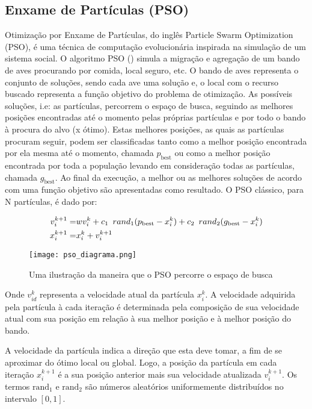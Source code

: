 \documentclass{article}
\begin{document}
\subsection{Enxame de Partículas (PSO)}
Otimização por Enxame de Partículas, do inglês Particle Swarm Optimization (PSO), é uma técnica de computação evolucionária inspirada na simulação de um sistema social. O algoritmo PSO (\cite{bai2010analysis}) simula a migração e agregação de um bando de aves procurando por comida, local seguro, etc. O bando de aves representa o conjunto de soluções, sendo cada ave uma solução e, o local com o recurso buscado representa a função objetivo do problema de otimização. As possíveis soluções, i.e: as partículas, percorrem o espaço de busca, seguindo as melhores posições encontradas até o momento pelas próprias partículas e por todo o bando à procura do alvo (x ótimo). Estas melhores posições, as quais as partículas procuram seguir, podem ser classificadas tanto como a melhor posição encontrada por ela mesma até o momento, chamada $p_{\text{best}}$ ou como a melhor posição encontrada por toda a população levando em consideração todas as partículas, chamada $g_{\text{best}}$. Ao final da execução, a melhor ou as melhores soluções de acordo com uma função objetivo são apresentadas como resultado.
O PSO clássico, para N partículas, é dado por:

\begin{equation}
\begin{split}
v_{i}^{k+1} = & w v_{i}^{k} + c_1 \text{\phantom{0}} rand_{1} (p_{\text{best}} - x_{i}^{k}) + c_2 \text{\phantom{0}} rand_{2} (g_{\text{best}} - x_{i}^{k}) \\
x_{i}^{k+1} = & x_{i}^{k} + v_{i}^{k+1}
\end{split}
\end{equation}

\begin{figure}[H]
  \centering
  \texttt{[image: pso\_diagrama.png]}
  \caption{Uma ilustração da maneira que o PSO percorre o espaço de busca}
\end{figure}

Onde $v_{id}^{k}$ representa a velocidade atual da partícula $x_{i}^{k}$. 
A velocidade adquirida pela partícula à cada iteração é determinada 
pela composição de sua velocidade atual com sua posição em relação à sua melhor posição e à melhor
posição do bando. \newline

A velocidade da partícula indica a direção que esta deve tomar, a fim de se aproximar do ótimo local ou global. Logo, a posição da partícula em cada iteração $x_{i}^{k+1}$ é a sua posição anterior mais sua velocidade atualizada $v_{i}^{k+1}$. Os termos $\text{rand}_{1}$ e $\text{rand}_{2}$ são números aleatórios uniformemente distribuídos no intervalo $[0, 1]$. \newline
\end{document}
